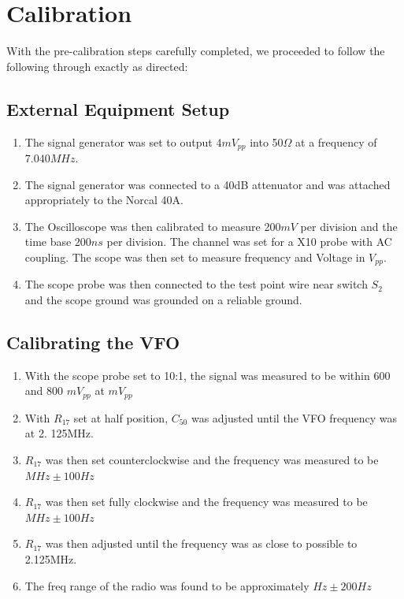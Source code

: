 \documentclass{./cls/hw}
\begin{document}
\section{Calibration}
With the pre-calibration steps carefully completed, we proceeded to follow the
following through exactly as directed:
\subsection{External Equipment Setup}
\begin{enumerate}
  \item The signal generator was set to output $4mV_{pp}$ into 50$\Omega$ at a
    frequency of $7.040MHz$.
  \item The signal generator was connected to a 40dB attenuator and was
    attached appropriately to the Norcal 40A.
  \item The Oscilloscope was then calibrated to measure 200$mV$ per division
    and the time base 200$ns$ per division. The channel was set for a X10 probe
    with AC coupling. The scope was then set to measure frequency and Voltage
    in $V_{pp}$.
  \item The scope probe was then connected to the test point wire near switch
    $S_2$ and the scope ground was grounded on a reliable ground.
\end{enumerate}
\subsection{Calibrating the VFO}
\begin{enumerate}
  \item With the scope probe set to 10:1, the signal was measured to be within
    600 and 800 $mV_{pp}$ at $\boxed{mV_{pp}}$
  \item With $R_{17}$ set at half position, $C_{50}$ was adjusted until the VFO frequency was at 2.
    125MHz.
  \item $R_{17}$ was then set counterclockwise and the frequency was measured
    to be $\boxed{ MHz\pm 100Hz}$
  \item $R_{17}$ was then set fully clockwise and the frequency was measured
    to be $\boxed{ MHz\pm 100Hz}$
  \item $R_17$ was then adjusted until the frequency was as close to possible
    to 2.125MHz.
  \item The freq range of the radio was found to be approximately $\boxed{
    Hz\pm 200Hz}$
\end{enumerate}
\end{document}
